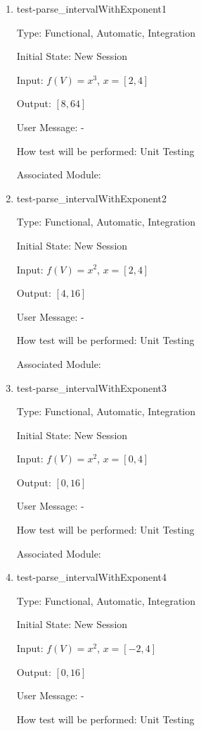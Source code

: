 \documentclass[12pt, titlepage]{article}
\begin{document}
\begin{enumerate}
	
	\item{test-parse\_intervalWithExponent1}
	
	Type: Functional, Automatic, Integration
	
	Initial State: New Session
	
	Input: $f(V) = x^3$, $x = [2,4]$
	
	Output: $[8,64]$
	
	User Message: - 
	
	How test will be performed: Unit Testing
	
	Associated Module: \\
	
	\item{test-parse\_intervalWithExponent2}
	
	Type: Functional, Automatic, Integration
	
	Initial State: New Session
	
	Input: $f(V) = x^2$, $x = [2,4]$
	
	Output: $[4,16]$
	
	User Message: - 
	
	How test will be performed: Unit Testing
	
	Associated Module: \\
	
	\item{test-parse\_intervalWithExponent3}
	
	Type: Functional, Automatic, Integration
	
	Initial State: New Session
	
	Input: $f(V) = x^2$, $x = [0,4]$
	
	Output: $[0,16]$
	
	User Message: - 
	
	How test will be performed: Unit Testing
	
	Associated Module: \\
	
	\item{test-parse\_intervalWithExponent4}
	
	Type: Functional, Automatic, Integration
	
	Initial State: New Session
	
	Input: $f(V) = x^2$, $x = [-2,4]$
	
	Output: $[0,16]$
	
	User Message: - 
	
	How test will be performed: Unit Testing
	

\end{enumerate}
\end{document}
